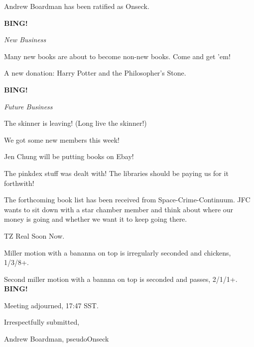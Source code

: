 \documentclass[12pt]{article}
\newcommand{\bing}{{\bf BING!} }
\newcommand{\goto}[1]{\bing \vskip 12pt \centerline{{\em{#1}}}}
\begin{document}
Andrew Boardman has been ratified as Onseck.

\goto{New Business}

Many new books are about to become non-new books.  Come and get 'em!

A new donation: Harry Potter and the Philosopher's Stone.

\goto{Future Business}

The skinner is leaving!  (Long live the skinner!)

We got some new members this week!

Jen Chung will be putting books on Ebay!

The pinkdex stuff was dealt with!  The libraries should be paying us for
it forthwith!

The forthcoming book list has been received from Space-Crime-Continuum.
JFC wants to sit down with a star chamber member and think about where
our money is going and whether we want it to keep going there.

TZ Real Soon Now.

Miller motion with a bananna on top is irregularly seconded and chickens,
1/3/8+.

Second miller motion with a bannna on top is seconded and passes,
2/1/1+. \bing

\vspace{12pt}

\noindent
Meeting adjourned, 17:47 SST.

\vspace{18pt}

\centerline{Irrespectfully submitted,}
\centerline{Andrew Boardman, pseudoOnseck}
\end{document}
